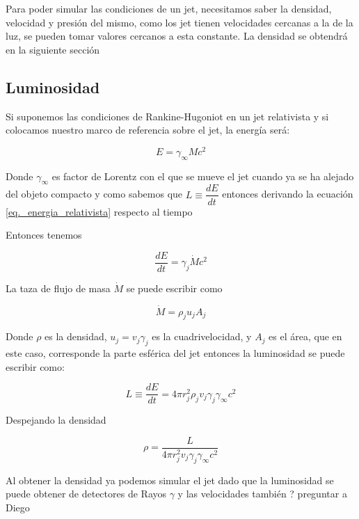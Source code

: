 \documentclass[12pt,a4paper]{book}
\begin{document}
Para poder simular las condiciones de un jet, necesitamos saber la densidad, velocidad y presión del mismo, como los jet tienen velocidades cercanas a la
de la luz, se pueden tomar valores cercanos a esta constante. La densidad se obtendrá en la siguiente sección 


\subsection{Luminosidad}
Si suponemos las condiciones de Rankine-Hugoniot en un jet relativista y si colocamos nuestro marco de referencia sobre el jet, la energía será:

\begin{equation} \label{eq._energia_relativista}
  E = \gamma_{\infty} M c^2
\end{equation}

Donde $\gamma_{\infty}$ es factor de Lorentz con el que se mueve el jet cuando ya se ha alejado del objeto compacto y como sabemos 
que $L \equiv \dfrac{d E}{d t}$ entonces derivando la ecuación \ref{eq._energia_relativista} respecto al tiempo

Entonces tenemos 

\begin{equation} \label{eq._luminosidad_relativista}
  \dfrac{d E}{d t} = \gamma_{j} \dot{ M }  c^2
\end{equation}

La taza de flujo de masa $\dot{M}$ se puede escribir como

\begin{equation}
  \dot{M} = \rho_j u_j A_j
\end{equation}

Donde $\rho$ es la densidad, $u_j = v_j \gamma_{j}$ es la cuadrivelocidad,  y $A_j$ es el área, que en este caso, corresponde la parte esférica del jet
entonces la luminosidad se puede escribir como:

\begin{equation}
  L \equiv \dfrac{d E}{d t} = 4\pi r_j^2 \rho_j v_j \gamma_j \gamma_{\infty} c^2
\end{equation}

Despejando la densidad

\begin{equation}
  \rho = \frac{L}{4\pi r_j^2 v_j \gamma_j \gamma_{\infty} c^2}
\end{equation}

Al obtener la densidad ya podemos simular el jet dado que la luminosidad se puede obtener de detectores de Rayos $\gamma$ y las velocidades también ? preguntar a 
Diego
\end{document}
